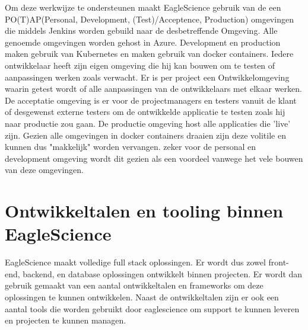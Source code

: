 Om deze werkwijze te ondersteunen maakt EagleScience gebruik van de een PO(T)AP(Personal, Development, (Test)/Acceptence, Production) omgevingen die middels Jenkins worden gebuild naar de desbetreffende Omgeving. Alle genoemde omgevingen worden gehost in Azure. Development en production maken gebruik van Kubernetes en maken gebruik van docker containers. Iedere ontwikkelaar heeft zijn eigen omgeving die hij kan bouwen om te testen of aanpassingen werken zoals verwacht. Er is per project een Ontwikkelomgeving waarin getest wordt of alle aanpassingen van de ontwikkelaars met elkaar werken. De acceptatie omgeving is er voor de projectmanagers en testers vanuit de klant of desgewenst externe testers om de ontwikkelde applicatie te testen zoals hij naar productie zou gaan. De productie omgeving host alle applicaties die 'live' zijn. Gezien alle omgevingen in docker containers draaien zijn deze volitile en kunnen dus "makkelijk" worden vervangen. zeker voor de personal en development omgeving wordt dit gezien als een voordeel vanwege het vele bouwen van deze omgevingen.


\section{Ontwikkeltalen en tooling binnen EagleScience}\label{sec:ontwikkeltalen-en-tooling-binnen-eaglescience}
EagleScience maakt volledige full stack oplossingen. Er wordt dus zowel front-end, backend, en database oplossingen ontwikkelt binnen projecten. Er wordt dan gebruik gemaakt van een aantal ontwikkeltalen en frameworks om deze oplossingen te kunnen ontwikkelen. Naast de ontwikkeltalen zijn er ook een aantal tools die worden gebruikt door eaglescience om support te kunnen leveren en projecten te kunnen managen.

